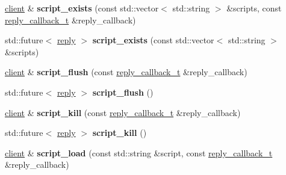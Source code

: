 \begin{DoxyCompactItemize}
\item 
\mbox{\label{classcpp__redis_1_1client_a6fcb8af437a9ae919af745cd0a0fa313}} 
\hyperlink{classcpp__redis_1_1client}{client} \& {\bfseries script\+\_\+exists} (const std\+::vector$<$ std\+::string $>$ \&scripts, const \hyperlink{classcpp__redis_1_1client_a061a1140d36d2eaeda82b09a0bb3f9f2}{reply\+\_\+callback\+\_\+t} \&reply\+\_\+callback)
\item 
\mbox{\label{classcpp__redis_1_1client_ab55eac91086b7746d731c8405f901016}} 
std\+::future$<$ \hyperlink{classcpp__redis_1_1reply}{reply} $>$ {\bfseries script\+\_\+exists} (const std\+::vector$<$ std\+::string $>$ \&scripts)
\item 
\mbox{\label{classcpp__redis_1_1client_a6d885c8b61bfbb74245be8d040813637}} 
\hyperlink{classcpp__redis_1_1client}{client} \& {\bfseries script\+\_\+flush} (const \hyperlink{classcpp__redis_1_1client_a061a1140d36d2eaeda82b09a0bb3f9f2}{reply\+\_\+callback\+\_\+t} \&reply\+\_\+callback)
\item 
\mbox{\label{classcpp__redis_1_1client_a44f5707f8487285d69737b7857c436d7}} 
std\+::future$<$ \hyperlink{classcpp__redis_1_1reply}{reply} $>$ {\bfseries script\+\_\+flush} ()
\item 
\mbox{\label{classcpp__redis_1_1client_a65abffc1a1669931d5b6715f354b59af}} 
\hyperlink{classcpp__redis_1_1client}{client} \& {\bfseries script\+\_\+kill} (const \hyperlink{classcpp__redis_1_1client_a061a1140d36d2eaeda82b09a0bb3f9f2}{reply\+\_\+callback\+\_\+t} \&reply\+\_\+callback)
\item 
\mbox{\label{classcpp__redis_1_1client_a35286249f2405afa0cf412472c1067b4}} 
std\+::future$<$ \hyperlink{classcpp__redis_1_1reply}{reply} $>$ {\bfseries script\+\_\+kill} ()
\item 
\mbox{\label{classcpp__redis_1_1client_a1c1d1b3daff14dc29c32d1ea8407efdb}} 
\hyperlink{classcpp__redis_1_1client}{client} \& {\bfseries script\+\_\+load} (const std\+::string \&script, const \hyperlink{classcpp__redis_1_1client_a061a1140d36d2eaeda82b09a0bb3f9f2}{reply\+\_\+callback\+\_\+t} \&reply\+\_\+callback)

\end{DoxyCompactItemize}
